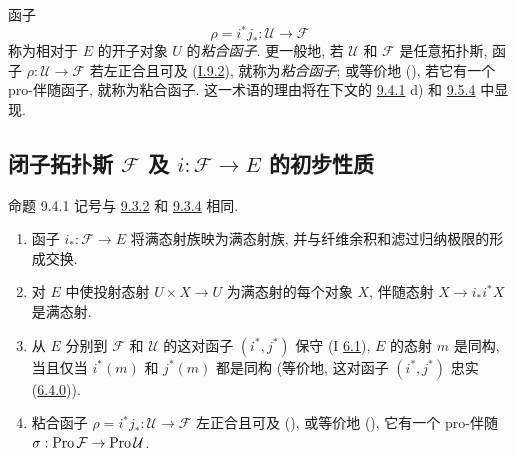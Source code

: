 函子
\begin{equation*}
\rho=i^{\ast}j_{\ast}:\mathcal{U}\longrightarrow
\mathcal{F}\tag{9.3.6.3}
\end{equation*}
称为相对于 $E$ 的开子对象 $U$ 的\emph{粘合函子}.
更一般地, 若 $\mathcal{U}$ 和 $\mathcal{F}$ 是任意拓扑斯,
函子 $\rho:\mathcal{U}\rightarrow \mathcal{F}$
若左正合且可及 (\hyperref[I.def9.2]{I.9.2}), 就称为\emph{粘合函子};
或等价地 (),
若它有一个 pro-伴随函子, 就称为粘合函子.
这一术语的理由将在下文的 \hyperref[IV.prop9.4.1]{9.4.1} d)
和 \hyperref[IV.theo9.5.4]{9.5.4} 中显现.



\subsection{闭子拓扑斯 $\mathcal{F}$ 及 $i:\mathcal{F}\rightarrow E$ 的初步性质}

\begin{enonce*}{命题 9.4.1}
记号与 \hyperref[IV.subsubsec9.3.2]{9.3.2}
和 \hyperref[IV.prop9.3.4]{9.3.4} 相同.
\begin{enumerate}
\renewcommand{\theenumi}{\alph{enumi}}
\renewcommand{\labelenumi}{\theenumi)}
\item 函子 $i_{\ast}:\mathcal{F}\rightarrow E$
将满态射族映为满态射族, 并与纤维余积和滤过归纳极限的形成交换.

\item 对 $E$ 中使投射态射 $U\times X\rightarrow U$ 为满态射的每个对象 $X$,
伴随态射 $X\rightarrow i_{\ast}i^{\ast}X$ 是满态射.

\hypertarget{sga4.exp.IV.proposition.9.4.1.item.c}{}\item 从 $E$ 分别到 $\mathcal{F}$
和 $\mathcal{U}$ 的这对\pageoriginale 函子 $(i^{\ast},j^{\ast})$
保守 {\rm(I \hyperref[I.def6.1]{6.1})},
\ie $E$ 的态射 $m$ 是同构,
当且仅当 $i^{\ast}(m)$ 和 $j^{\ast}(m)$ 都是同构
(等价地, 这对函子 $(i^{\ast},j^{\ast})$ 忠实
(\hyperref[IV.subsubsec6.4.0]{6.4.0})).

\item 粘合函子 $\rho=i^{\ast}j_{\ast}:\mathcal{U}\rightarrow\mathcal{F}$
左正合且可及 {\rm()},
或等价地 {\rm()},
它有一个 pro-伴随 $\sigma:\operatorname{Pro}\mathcal{F}\rightarrow\operatorname{Pro}\mathcal{U}$.
\end{enumerate}
\end{enonce*}

